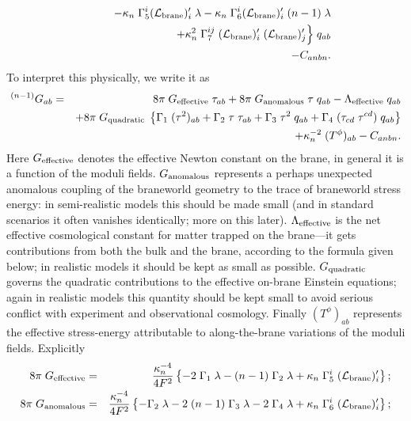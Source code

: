 \documentclass[a4paper,10pt]{article}
\begin{document}
{\begin{eqnarray}
&&
\qquad
-\kappa_n \; \Gamma_5^i  (\L_\brane)'_i  \; \lambda
-\kappa_n \; \Gamma_6^i  (\L_\brane)'_i  \; (n-1) \; \lambda
\nonumber\\
&&
\qquad
+\kappa_n^2 \; \Gamma_7^{ij} \; (\L_\brane)'_i \;  (\L_\brane)'_j
\Big\} \; q_{ab}
\nonumber \\
&&\hspace{-6mm}
-C_{anbn}.
\label{E:brane-einstein-tensor-6}
\end{eqnarray}
%
To interpret this physically, we write it as
%
\begin{eqnarray}
{}^{(n-1)}G_{ab} &=& 
8\pi\;G_{\mathrm{effective}} \; \tau_{ab} 
+ 
8\pi\;G_{\mathrm{anomalous}} \; \tau \; q_{ab} 
-
\Lambda_{\mathrm{effective}} \; q_{ab}
\nonumber\\
&&
+ 8\pi\;G_{\mathrm{quadratic}} \;  
\left\{
\Gamma_1 \; (\tau^2)_{ab} 
+
\Gamma_2 \; \tau \; \tau_{ab} 
+
\Gamma_3 \; \tau^2 \; q_{ab} 
+
\Gamma_4 \; (\tau_{cd}\;\tau^{cd}) \; q_{ab}
\right\}
\nonumber\\
&&
+\kappa_n^{-2} \; (T^\phi)_{ab} - C_{anbn}.
\label{E:physical}
\end{eqnarray}
%
Here $G_{\mathrm{effective}}$ denotes the effective Newton constant on the
brane, in general it is a function of the moduli
fields. $G_{\mathrm{anomalous}}$ represents a perhaps unexpected anomalous
coupling of the braneworld geometry to the trace of braneworld stress
energy: in semi-realistic models this should be made small (and in
standard scenarios it often vanishes identically; more on this
later). $\Lambda_{\mathrm{effective}}$ is the net effective cosmological
constant for matter trapped on the brane---it gets contributions from
both the bulk and the brane, according to the formula given below; in
realistic models it should be kept as small as
possible. $G_{\mathrm{quadratic}}$ governs the quadratic contributions to the
effective on-brane Einstein equations; again in realistic models this
quantity should be kept small to avoid serious conflict with
experiment and observational cosmology. Finally $(T^\phi)_{ab}$
represents the effective stress-energy attributable to along-the-brane
variations of the moduli fields. Explicitly
%
\begin{eqnarray}
8\pi\;G_\effective &=&  
{\kappa_n^{-4}\over4F^2} 
\left\{
-2 \; \Gamma_1 \; \lambda 
-(n-1) \;\Gamma_2 \;  \lambda
+\kappa_n \; \Gamma_5^i  \; (\L_\brane)'_i  
\right\};
\\
8\pi\;G_\anomalous &=&  
{\kappa_n^{-4}\over4F^2} 
\left\{
-\Gamma_2  \; \lambda 
-
2 \; (n-1) \;\Gamma_3 \; \lambda
-
2\; \Gamma_4 \; \lambda 
+\kappa_n \; \Gamma_6^i \; (\L_\brane)'_i  
\right\};

\end{eqnarray}}
\end{document}
